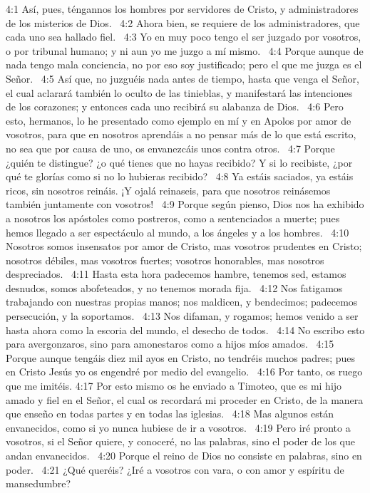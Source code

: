 4:1 Así, pues, téngannos los hombres por servidores de Cristo, y administradores de los misterios de Dios.  
4:2 Ahora bien, se requiere de los administradores, que cada uno sea hallado fiel.  
4:3 Yo en muy poco tengo el ser juzgado por vosotros, o por tribunal humano; y ni aun yo me juzgo a mí mismo.  
4:4 Porque aunque de nada tengo mala conciencia, no por eso soy justificado; pero el que me juzga es el Señor.  
4:5 Así que, no juzguéis nada antes de tiempo, hasta que venga el Señor, el cual aclarará también lo oculto de las tinieblas, y manifestará las intenciones de los corazones; y entonces cada uno recibirá su alabanza de Dios.  
4:6 Pero esto, hermanos, lo he presentado como ejemplo en mí y en Apolos por amor de vosotros, para que en nosotros aprendáis a no pensar más de lo que está escrito, no sea que por causa de uno, os envanezcáis unos contra otros.  
4:7 Porque ¿quién te distingue? ¿o qué tienes que no hayas recibido? Y si lo recibiste, ¿por qué te glorías como si no lo hubieras recibido?  
4:8 Ya estáis saciados, ya estáis ricos, sin nosotros reináis. ¡Y ojalá reinaseis, para que nosotros reinásemos también juntamente con vosotros!  
4:9 Porque según pienso, Dios nos ha exhibido a nosotros los apóstoles como postreros, como a sentenciados a muerte; pues hemos llegado a ser espectáculo al mundo, a los ángeles y a los hombres.  
4:10 Nosotros somos insensatos por amor de Cristo, mas vosotros prudentes en Cristo; nosotros débiles, mas vosotros fuertes; vosotros honorables, mas nosotros despreciados.  
4:11 Hasta esta hora padecemos hambre, tenemos sed, estamos desnudos, somos abofeteados, y no tenemos morada fija.  
4:12 Nos fatigamos trabajando con nuestras propias manos; nos maldicen, y bendecimos; padecemos persecución, y la soportamos.  
4:13 Nos difaman, y rogamos; hemos venido a ser hasta ahora como la escoria del mundo, el desecho de todos.  
4:14 No escribo esto para avergonzaros, sino para amonestaros como a hijos míos amados.  
4:15 Porque aunque tengáis diez mil ayos en Cristo, no tendréis muchos padres; pues en Cristo Jesús yo os engendré por medio del evangelio.  
4:16 Por tanto, os ruego que me imitéis. 
4:17 Por esto mismo os he enviado a Timoteo, que es mi hijo amado y fiel en el Señor, el cual os recordará mi proceder en Cristo, de la manera que enseño en todas partes y en todas las iglesias.  
4:18 Mas algunos están envanecidos, como si yo nunca hubiese de ir a vosotros.  
4:19 Pero iré pronto a vosotros, si el Señor quiere, y conoceré, no las palabras, sino el poder de los que andan envanecidos.  
4:20 Porque el reino de Dios no consiste en palabras, sino en poder.  
4:21 ¿Qué queréis? ¿Iré a vosotros con vara, o con amor y espíritu de mansedumbre?  
